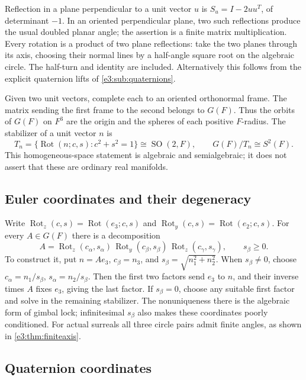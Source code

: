 \documentclass[11pt,letterpaper]{article}
\numberwithin{equation}{section}
\theoremstyle{definition}
\theoremstyle{remark}
\newcommand{\SO}{\operatorname{SO}}
\newcommand{\Rot}{\operatorname{Rot}}
\begin{document}
Reflection in a plane perpendicular to a unit vector \(u\) is
\(S_u=I-2uu^T\), of determinant \(-1\). In an oriented perpendicular plane,
two such reflections produce the usual doubled planar angle; the assertion is
a finite matrix multiplication. Every rotation is a product of two plane
reflections: take the two planes through its axis, choosing their normal lines
by a half-angle square root on the algebraic circle. The half-turn and identity
are included. Alternatively this follows from the explicit quaternion lifts
of \cref{e3:sub:quaternions}.

Given two unit vectors, complete each to an oriented orthonormal frame. The
matrix sending the first frame to the second belongs to \(G(F)\). Thus the
orbits of \(G(F)\) on \(F^3\) are the origin and the spheres of each positive
\(F\)-radius. The stabilizer of a unit vector \(n\) is
\begin{equation}\label{e3:so:eq:torus}
 T_n=\{\Rot(n;c,s):c^2+s^2=1\}\cong\SO(2,F),
 \qquad G(F)/T_n\cong S^2(F).
\end{equation}
This homogeneous-space statement is algebraic and semialgebraic; it does not
assert that these are ordinary real manifolds.

\subsection{Euler coordinates and their degeneracy}

Write \(\Rot_z(c,s)=\Rot(e_3;c,s)\) and \(\Rot_y(c,s)=\Rot(e_2;c,s)\).
For every \(A\in G(F)\) there is a decomposition
\begin{equation}\label{e3:so:eq:euler}
 A=\Rot_z(c_\alpha,s_\alpha)\,
   \Rot_y(c_\beta,s_\beta)\,\Rot_z(c_\gamma,s_\gamma),
 \qquad s_\beta\ge0.
\end{equation}
To construct it, put \(n=Ae_3\), \(c_\beta=n_3\), and
\(s_\beta=\sqrt{n_1^2+n_2^2}\). When \(s_\beta\ne0\), choose
\(c_\alpha=n_1/s_\beta\), \(s_\alpha=n_2/s_\beta\). Then the first two factors
send \(e_3\) to \(n\), and their inverse times \(A\) fixes \(e_3\), giving the
last factor. If \(s_\beta=0\), choose any suitable first factor and solve in the
remaining stabilizer. The nonuniqueness there is the algebraic form of gimbal
lock; infinitesimal \(s_\beta\) also makes these coordinates poorly conditioned.
For actual surreals all three circle pairs admit finite angles, as shown in
\cref{e3:thm:finiteaxis}.

\subsection{Quaternion coordinates}
\end{document}
